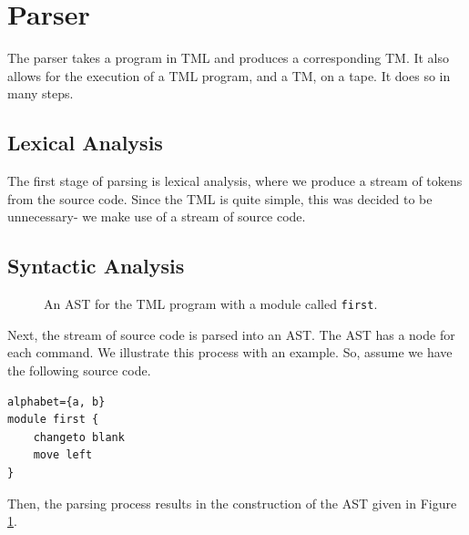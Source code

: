 \section{Parser}
The parser takes a program in TML and produces a corresponding TM. It also allows for the execution of a TML program, and a TM, on a tape. It does so in many steps.

\subsection{Lexical Analysis}
The first stage of parsing is lexical analysis, where we produce a stream of tokens from the source code. Since the TML is quite simple, this was decided to be unnecessary- we make use of a stream of source code.

\subsection{Syntactic Analysis}

\begin{figure}[htb]
    \centering
    \caption{An AST for the TML program with a module called \texttt{first}.}
    \label{fig:TML_AST}
\end{figure}

Next, the stream of source code is parsed into an AST. The AST has a node for each command. We illustrate this process with an example. So, assume we have the following source code.
\begin{lstlisting}[language=TML]
alphabet={a, b}
module first {
    changeto blank
    move left
}
\end{lstlisting}
Then, the parsing process results in the construction of the AST given in Figure \ref{fig:TML_AST}. 

